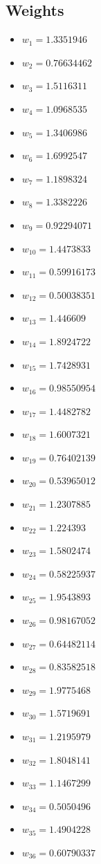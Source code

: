\documentclass[11pt]{article}
\begin{document}
\subsection*{Weights}
\begin{itemize}
\item $w_{1} = 1.3351946$
\item $w_{2} = 0.76634462$
\item $w_{3} = 1.5116311$
\item $w_{4} = 1.0968535$
\item $w_{5} = 1.3406986$
\item $w_{6} = 1.6992547$
\item $w_{7} = 1.1898324$
\item $w_{8} = 1.3382226$
\item $w_{9} = 0.92294071$
\item $w_{10} = 1.4473833$
\item $w_{11} = 0.59916173$
\item $w_{12} = 0.50038351$
\item $w_{13} = 1.446609$
\item $w_{14} = 1.8924722$
\item $w_{15} = 1.7428931$
\item $w_{16} = 0.98550954$
\item $w_{17} = 1.4482782$
\item $w_{18} = 1.6007321$
\item $w_{19} = 0.76402139$
\item $w_{20} = 0.53965012$
\item $w_{21} = 1.2307885$
\item $w_{22} = 1.224393$
\item $w_{23} = 1.5802474$
\item $w_{24} = 0.58225937$
\item $w_{25} = 1.9543893$
\item $w_{26} = 0.98167052$
\item $w_{27} = 0.64482114$
\item $w_{28} = 0.83582518$
\item $w_{29} = 1.9775468$
\item $w_{30} = 1.5719691$
\item $w_{31} = 1.2195979$
\item $w_{32} = 1.8048141$
\item $w_{33} = 1.1467299$
\item $w_{34} = 0.5050496$
\item $w_{35} = 1.4904228$
\item $w_{36} = 0.60790337$

\end{itemize}
\end{document}
